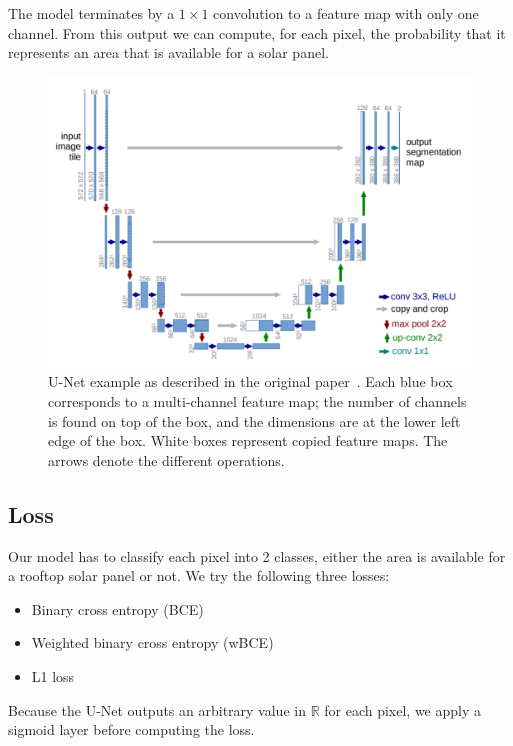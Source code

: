 \documentclass[10pt,conference]{IEEEtran}
\begin{document}
The model terminates by a $1 \times 1$ convolution to a feature map with only one channel.
From this output we can compute, for each pixel, the probability that it represents an area that is available for a solar panel.

\begin{figure}[tbp]
    \centering
    \includegraphics[width=\columnwidth]{report/images/UNet.png}
    \caption{
        U-Net example as described in the original paper~\cite{ronneberger2015unet}.
        Each blue box corresponds to a multi-channel feature map; the number of channels is found on top of the box, and the dimensions are at the lower left edge of the box.
        White boxes represent copied feature maps.
        The arrows denote the different operations.
    }
    \label{fig:UNetarchitecture}
\end{figure}

\subsection{Loss}\label{loss}
Our model has to classify each pixel into 2 classes, either the area is available for a rooftop solar panel or not. We try the following three losses:
\begin{itemize}
    \item Binary cross entropy (BCE)
    \item Weighted binary cross entropy (wBCE)
    \item L1 loss
\end{itemize}
Because the U-Net outputs an arbitrary value in $\mathbb{R}$ for each pixel, we apply a sigmoid layer before computing the loss.
\end{document}
